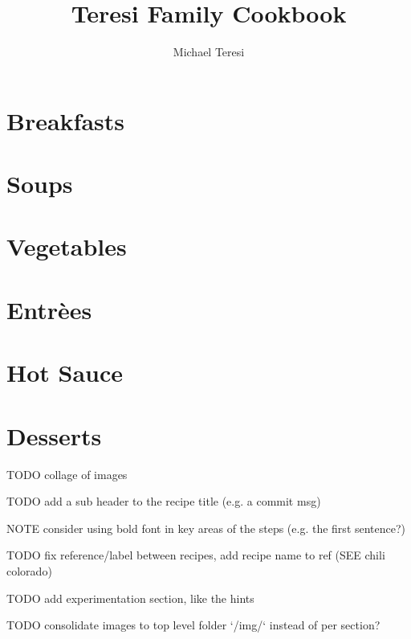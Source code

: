 \documentclass[]{article}
\begin{document}
\title{Teresi Family Cookbook}
\author{Michael Teresi}
\maketitle

\tableofcontents


\clearpage
\section{Breakfasts}


\clearpage
\section{Soups}



\clearpage
\section{Vegetables}


\clearpage
\section{Entr\`{e}es}





\clearpage
\section{Hot Sauce}


\clearpage
\section{Desserts}
TODO collage of images

TODO add a sub header to the recipe title (e.g. a commit msg)

NOTE consider using bold font in key areas of the steps (e.g. the first sentence?)

TODO fix reference/label between recipes, add recipe name to ref (SEE chili colorado)

TODO add experimentation section, like the hints

TODO consolidate images to top level folder `/img/` instead of per section?




\end{document}
